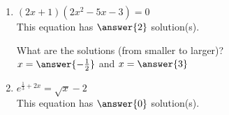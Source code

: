 \documentclass{ximera}
\begin{document}
\begin{enumerate}

\item 
\begin{exercise}
$(2x+1)(2x^2-5x-3)=0$ \\
This equation has $\answer{2}$ solution(s).
\begin{exercise}
What are the solutions (from smaller to larger)?\\
$x=\answer{-\frac{1}{2}}$ and $x=\answer{3}$
\end{exercise}
\end{exercise}

\item 
\begin{exercise}
$e^{\frac{1}{3} + 2x}=\sqrt{x}-2$ \\
This equation has $\answer{0}$ solution(s).
\end{exercise}


\end{enumerate}
\end{document}
